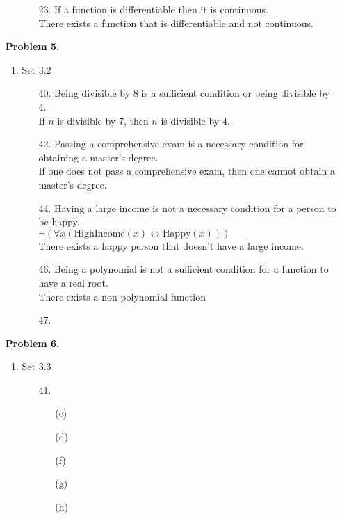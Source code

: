 \documentclass[letterpaper,fleqn]{article}
\begin{document}
\begin{enumerate}
\begin{enumerate}[]
\begin{enumerate}
				\item [23.]
				If a function is differentiable then it is continuous. \\
				There exists a function that is differentiable and not continuous.
			\end{enumerate}
		\end{enumerate}
		
		\item [] \textbf{Problem 5.}
		\begin{enumerate}[]
			\item Set 3.2
			\begin{enumerate}
				\item [40.]
				Being divisible by 8 is a sufficient condition or being divisible by 4. \\
				If $n$ is divisible by 7, then $n$ is divisible by 4.
				
				\item [42.]
				Passing a comprehensive exam is a necessary condition for obtaining a master's degree. \\
				If one does not pass a comprehensive exam, then one cannot obtain a master's degree.
				
				\item [44.]
				Having a large income is not a necessary condition for a person to be happy. \\
				$\neg(\forall x (\text{HighIncome}(x) \leftrightarrow \text{Happy}(x)))$ \\
				There exists a happy person that doesn't have a large income.
				
				\item [46.]
				Being a polynomial is not a sufficient condition for a function to have a real root. \\
				There exists a non polynomial function 
				
				\item [47.]
			\end{enumerate}
		\end{enumerate}
		
		\item [] \textbf{Problem 6.}
		\begin{enumerate}[]
			\item Set 3.3
			\begin{enumerate}
				\item [41.] \quad
				\begin{enumerate}
					\item [(c)]
					\item [(d)]
					\item [(f)]
					\item [(g)]
					\item [(h)]
				\end{enumerate}
			\end{enumerate}
		\end{enumerate}
		

\end{enumerate}
\end{document}
